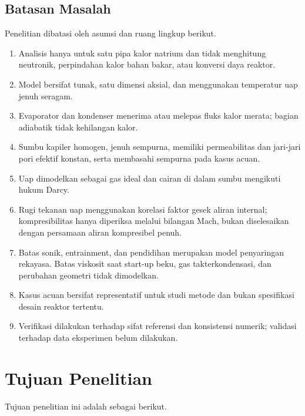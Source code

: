 \documentclass[
  12pt,a4paper,oneside]{report}
\providecommand{\tightlist}{%
  \setlength{\itemsep}{0pt}\setlength{\parskip}{0pt}}
\begin{document}
\hypertarget{batasan-masalah}{%
\subsection{Batasan Masalah}\label{batasan-masalah}}

Penelitian dibatasi oleh asumsi dan ruang lingkup berikut.

\begin{enumerate}
\def\labelenumi{\arabic{enumi}.}
\tightlist
\item
  Analisis hanya untuk satu pipa kalor natrium dan tidak menghitung
  neutronik, perpindahan kalor bahan bakar, atau konversi daya reaktor.
\item
  Model bersifat tunak, satu dimensi aksial, dan menggunakan temperatur
  uap jenuh seragam.
\item
  Evaporator dan kondenser menerima atau melepas fluks kalor merata;
  bagian adiabatik tidak kehilangan kalor.
\item
  Sumbu kapiler homogen, jenuh sempurna, memiliki permeabilitas dan
  jari-jari pori efektif konstan, serta membasahi sempurna pada kasus
  acuan.
\item
  Uap dimodelkan sebagai gas ideal dan cairan di dalam sumbu mengikuti
  hukum Darcy.
\item
  Rugi tekanan uap menggunakan korelasi faktor gesek aliran internal;
  kompresibilitas hanya diperiksa melalui bilangan Mach, bukan
  diselesaikan dengan persamaan aliran kompresibel penuh.
\item
  Batas sonik, entrainment, dan pendidihan merupakan model penyaringan
  rekayasa. Batas viskosit saat start-up beku, gas takterkondensasi, dan
  perubahan geometri tidak dimodelkan.
\item
  Kasus acuan bersifat representatif untuk studi metode dan bukan
  spesifikasi desain reaktor tertentu.
\item
  Verifikasi dilakukan terhadap sifat referensi dan konsistensi numerik;
  validasi terhadap data eksperimen belum dilakukan.
\end{enumerate}

\hypertarget{tujuan-penelitian}{%
\section{Tujuan Penelitian}\label{tujuan-penelitian}}

Tujuan penelitian ini adalah sebagai berikut.
\end{document}
